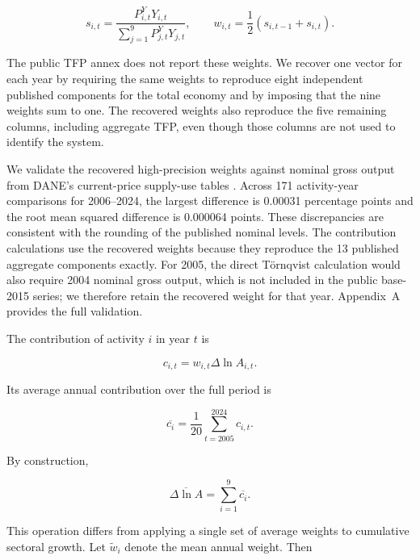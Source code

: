 \begin{equation}
s_{i,t}
=
\frac{P^{Y}_{i,t}Y_{i,t}}
{\sum_{j=1}^{9}P^{Y}_{j,t}Y_{j,t}},
\qquad
w_{i,t}
=
\frac{1}{2}\left(s_{i,t-1}+s_{i,t}\right).
\label{eq:gross_output_weight}
\end{equation}

The public TFP annex does not report these weights. We recover one vector for each year by requiring the same weights to reproduce eight independent published components for the total economy and by imposing that the nine weights sum to one. The recovered weights also reproduce the five remaining columns, including aggregate TFP, even though those columns are not used to identify the system.

We validate the recovered high-precision weights against nominal gross output from DANE's current-price supply-use tables \citep{DANE2020COU,DANE2026COU}. Across 171 activity-year comparisons for 2006--2024, the largest difference is 0.00031 percentage points and the root mean squared difference is 0.000064 points. These discrepancies are consistent with the rounding of the published nominal levels. The contribution calculations use the recovered weights because they reproduce the 13 published aggregate components exactly. For 2005, the direct T\"ornqvist calculation would also require 2004 nominal gross output, which is not included in the public base-2015 series; we therefore retain the recovered weight for that year. Appendix~A provides the full validation.

The contribution of activity \(i\) in year \(t\) is

\begin{equation}
c_{i,t}=w_{i,t}\Delta\ln A_{i,t}.
\label{eq:annual_contribution}
\end{equation}

Its average annual contribution over the full period is

\begin{equation}
\overline{c_i}
=\frac{1}{20}\sum_{t=2005}^{2024}c_{i,t}.
\label{eq:long_run_contribution}
\end{equation}

By construction,

\begin{equation}
\overline{\Delta\ln A}
=\sum_{i=1}^{9}\overline{c_i}.
\label{eq:long_run_adding_up}
\end{equation}

This operation differs from applying a single set of average weights to cumulative sectoral growth. Let \(\widetilde{w}_i\) denote the mean annual weight. Then

